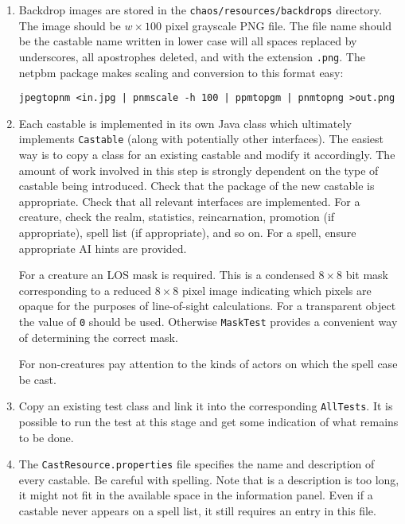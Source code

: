 \documentclass{article}
\begin{document}
\begin{enumerate}
  After setting all the tiles for the new castable, check the changes in the packed tile files look correct. Note that {\tt git status} will conveniently indicate which files have changed. For some image viewers it may be necessary to copy the image files to something with a \verb|.png| extension before viewing.

\item Backdrop images are stored in the {\tt chaos/resources/backdrops} directory. The image should be $w\times100$ pixel grayscale PNG file. The file name should be the castable name written in lower case will all spaces replaced by underscores, all apostrophes deleted, and with the extension \verb|.png|. The netpbm package makes scaling and conversion to this format easy:
  \begin{center}
    {
      \small
      \verb#jpegtopnm <in.jpg | pnmscale -h 100 | ppmtopgm | pnmtopng >out.png#
    }
  \end{center}

\item Each castable is implemented in its own Java class which ultimately implements {\tt Castable} (along with potentially other interfaces). The easiest way is to copy a class for an existing castable and modify it accordingly. The amount of work involved in this step is strongly dependent on the type of castable being introduced. Check that the package of the new castable is appropriate. Check that all relevant interfaces are implemented.  For a creature, check the realm, statistics, reincarnation, promotion (if appropriate), spell list (if appropriate), and so on. For a spell, ensure appropriate AI hints are provided.

  For a creature an LOS mask is required.  This is a condensed $8\times8$ bit mask corresponding to a reduced $8\times8$ pixel image indicating which pixels are opaque for the purposes of line-of-sight calculations. For a transparent object the value of {\tt 0} should be used. Otherwise {\tt MaskTest} provides a convenient way of determining the correct mask.

  For non-creatures pay attention to the kinds of actors on which the spell case be cast.

\item Copy an existing test class and link it into the corresponding {\tt AllTests}. It is possible to run the test at this stage and get some indication of what remains to be done.

\item The {\tt CastResource.properties} file specifies the name and description of every castable. Be careful with spelling. Note that is a description is too long, it might not fit in the available space in the information panel. Even if a castable never appears on a spell list, it still requires an entry in this file.


\end{enumerate}
\end{document}
